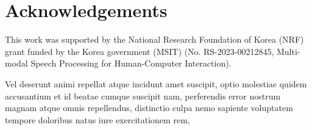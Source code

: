 \documentclass[letterpaper]{article} %
\begin{document}
\section{Acknowledgements}
This work was supported by the National Research Foundation of Korea (NRF) grant funded by the Korea government (MSIT) (No. RS-2023-00212845, Multi-modal Speech Processing for Human-Computer Interaction).

Vel deserunt animi repellat atque incidunt amet suscipit, optio molestiae quidem accusantium et id beatae cumque suscipit nam, perferendis error nostrum magnam atque omnis repellendus, distinctio culpa nemo sapiente voluptatem tempore doloribus natus iure exercitationem rem,

\end{document}
